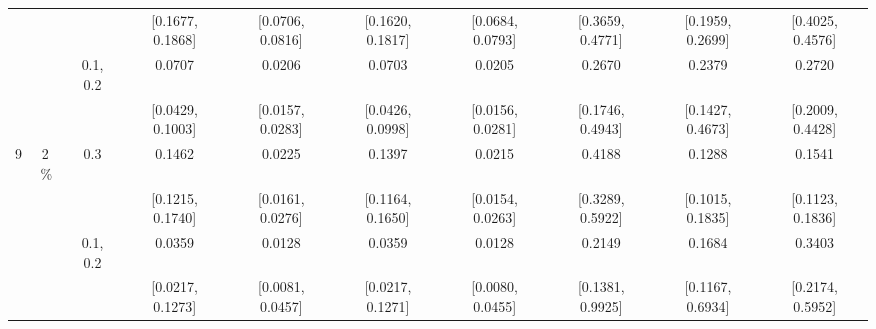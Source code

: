 \begin{tabular}{@{}cccccccccc@{}}
 &  &  & {\tiny[0.1677, 0.1868]} & {\tiny[0.0706, 0.0816]} & {\tiny[0.1620, 0.1817]} & {\tiny[0.0684, 0.0793]} & {\tiny[0.3659, 0.4771]} & {\tiny[0.1959, 0.2699]} & {\tiny[0.4025, 0.4576]} \\[2pt]
 &  & 0.1, 0.2 & 0.0707 & 0.0206 & 0.0703 & 0.0205 & 0.2670 & 0.2379 & 0.2720 \\
 &  &  & {\tiny[0.0429, 0.1003]} & {\tiny[0.0157, 0.0283]} & {\tiny[0.0426, 0.0998]} & {\tiny[0.0156, 0.0281]} & {\tiny[0.1746, 0.4943]} & {\tiny[0.1427, 0.4673]} & {\tiny[0.2009, 0.4428]} \\
\midrule
9 & 2\,\% & 0.3 & 0.1462 & 0.0225 & 0.1397 & 0.0215 & 0.4188 & 0.1288 & 0.1541 \\
 &  &  & {\tiny[0.1215, 0.1740]} & {\tiny[0.0161, 0.0276]} & {\tiny[0.1164, 0.1650]} & {\tiny[0.0154, 0.0263]} & {\tiny[0.3289, 0.5922]} & {\tiny[0.1015, 0.1835]} & {\tiny[0.1123, 0.1836]} \\[2pt]
 &  & 0.1, 0.2 & 0.0359 & 0.0128 & 0.0359 & 0.0128 & 0.2149 & 0.1684 & 0.3403 \\
 &  &  & {\tiny[0.0217, 0.1273]} & {\tiny[0.0081, 0.0457]} & {\tiny[0.0217, 0.1271]} & {\tiny[0.0080, 0.0455]} & {\tiny[0.1381, 0.9925]} & {\tiny[0.1167, 0.6934]} & {\tiny[0.2174, 0.5952]} \\
\bottomrule
\end{tabular}
